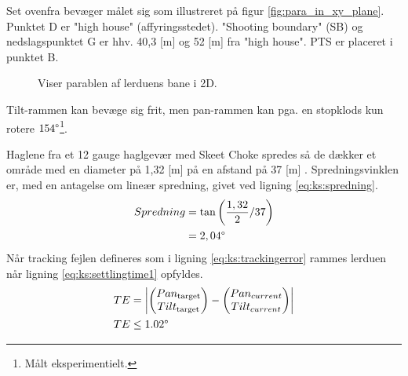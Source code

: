 Set ovenfra bevæger målet sig som illustreret på figur \ref{fig:para_in_xy_plane}.
Punktet D er "high house" (affyringsstedet).
"Shooting boundary" (SB) og nedslagspunktet G er hhv. 40,3 [m] og 52 [m] fra "high house". PTS er placeret i punktet B.\\
\begin{figure}[h!]
\centering
{}
\caption[Lerduens parabel i 2D]{Viser parablen af lerduens bane i 2D.}
\end{figure}

Tilt-rammen kan bevæge sig frit,
men pan-rammen kan pga. en stopklods kun rotere \(154 \degree\)\footnote{Målt eksperimentielt.}.

Haglene fra et 12 gauge haglgevær med Skeet Choke spredes så de dækker et område
med en diameter på 1,32 [m] på en afstand på 37 [m] \citep[Pattern and choke]{patternandchoke}.
Spredningsvinklen er, med en antagelse om lineær spredning, givet ved ligning \ref{eq:ks:spredning}.
\begin{align}
\begin{split}
  Spredning &= \tan \left(\frac{1,32}{2} / 37 \right) \\
  &= 2,04 \degree
  \end{split}
  \label{eq:ks:spredning}
\end{align}
Når tracking fejlen defineres som i ligning \ref{eq:ks:trackingerror} rammes 
lerduen når ligning \ref{eq:ks:settlingtime1} opfyldes.
\begin{align}
\begin{split}
  TE &= \left | \begin{pmatrix}  Pan_{\text{target}}\\ Tilt_{\text{target}}\end{pmatrix} - \begin{pmatrix} Pan_{current}\\ 
  Tilt_{current}\end{pmatrix} \right | 
  \\
  TE &\leq 1.02\degree
\end{split}
\label{eq:ks:trackingerror}
\end{align}

